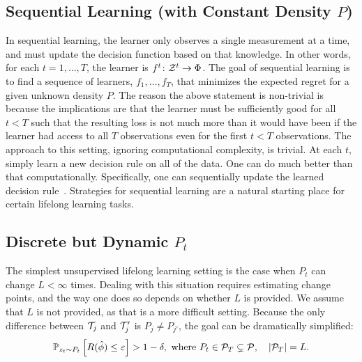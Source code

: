 \documentclass{article}
\begin{document}
\subsection{Sequential Learning (with Constant Density $P$)}
\label{sec:constant}


In sequential learning, the learner only observes a single measurement at a time, and must update the decision function based on that knowledge.  In other words, for each $t = 1,\ldots, T$, the learner is $f^t {\colon} \mathcal{Z}^t \to \Phi$.  
%  
The goal of sequential learning is to find a sequence of learners, $f_1, \ldots, f_T$, that minimizes the expected regret for a given unknown density $P$.  The reason the above statement is non-trivial is because the implications are that the learner must be sufficiently good for all $t<T$ such that the resulting loss is not much more than it would have been if the learner had access to all $T$ observations even for the first $t<T$ observations.
% 
The approach to this setting, ignoring computational complexity, is trivial.  At each $t$, simply learn a new decision rule on all of the data. One can do much better than that computationally.  Specifically, one can sequentially update the learned decision rule~\cite{Xiao2010}. Strategies for sequential learning are a natural starting place for certain lifelong learning tasks.



\subsection{Discrete but Dynamic $P_t$}
\label{sec:jumps}

The simplest unsupervised lifelong learning setting is the case when $P_t$ can change $L < \infty$ times.  Dealing with this situation requires estimating change points, and the way one does so depends on whether $L$ is provided.  We assume that $L$ is not provided, as that is a more difficult setting.  Because  the only difference between $\mathcal{T}_j$ and $\mathcal{T}_j'$ is $P_j \neq P_{j'}$, the goal can be dramatically simplified:
\begin{align} \label{eq:online}        
    \mathbb{P}_{ z_t \sim P_t} \left[R(\hat{\phi})  \leq \varepsilon \right] > 1 - \delta, \text{ where } P_t \in \mathcal{P}_T \subsetneq \mathcal{P}, \quad |\mathcal{P}_T| = L.
\end{align}
    
\end{document}
